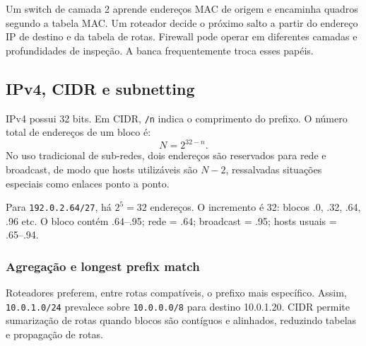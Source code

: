 \begin{center}
\end{center}

Um switch de camada 2 aprende endereços MAC de origem e encaminha quadros segundo a tabela MAC. Um roteador decide o próximo salto a partir do endereço IP de destino e da tabela de rotas. Firewall pode operar em diferentes camadas e profundidades de inspeção. A banca frequentemente troca esses papéis.

\subsection{IPv4, CIDR e subnetting}

IPv4 possui 32 bits. Em CIDR, \texttt{/n} indica o comprimento do prefixo. O número total de endereços de um bloco é:
\[
N=2^{32-n}.
\]
No uso tradicional de sub-redes, dois endereços são reservados para rede e broadcast, de modo que hosts utilizáveis são $N-2$, ressalvadas situações especiais como enlaces ponto a ponto.

\begin{exemplo}
Para \texttt{192.0.2.64/27}, há $2^{5}=32$ endereços. O incremento é 32: blocos .0, .32, .64, .96 etc. O bloco contém .64--.95; rede = .64; broadcast = .95; hosts usuais = .65--.94.
\end{exemplo}

\subsubsection{Agregação e longest prefix match}

Roteadores preferem, entre rotas compatíveis, o prefixo mais específico. Assim, \texttt{10.0.1.0/24} prevalece sobre \texttt{10.0.0.0/8} para destino 10.0.1.20. CIDR permite sumarização de rotas quando blocos são contíguos e alinhados, reduzindo tabelas e propagação de rotas.

